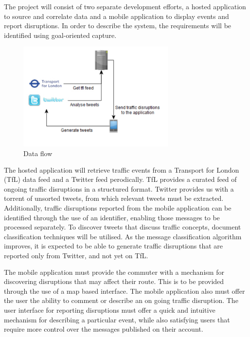 The project will consist of two separate development efforts, a
hosted application to source and correlate data and a mobile application to
display events and report disruptions. In order to describe the system, the
requirements will be identified using goal-oriented capture\cite{Requirements}.

\begin{figure}[here]
\begin{center}
\includegraphics[width=0.7\textwidth]{images/draft_architecture.pdf}
\end{center}
\vspace{-20pt}
\caption{Data flow}
\end{figure}

The hosted application will retrieve traffic events from a Transport for London
(TfL)\cite{website:tfl_dev} data feed and a Twitter
feed\cite{website:twitter_dev} perodically. TfL provides a curated feed of
ongoing traffic disruptions in a structured format. Twitter provides us with a
torrent of unsorted tweets, from which relevant tweets must be extracted. 
Additionally, traffic disruptions reported from the mobile application can be
identified through the use of an identifier, enabling those messages to be
processed separately. To discover tweets that discuss traffic concepts,
document classification techniques will be utilised. As the message
classification algorithm improves, it is expected to be able to generate 
traffic disruptions that are reported only from Twitter, and not yet on TfL.

The mobile application must provide the commuter with a mechanism for discovering disruptions that may affect their route. This is to be provided through the use of a map based interface. The mobile application also must offer the user the ability to comment or describe an on going traffic disruption. The user interface for reporting disruptions must offer a quick and intuitive mechanism for describing a particular event, while also satisfying users that require more control over the messages published on their account.

